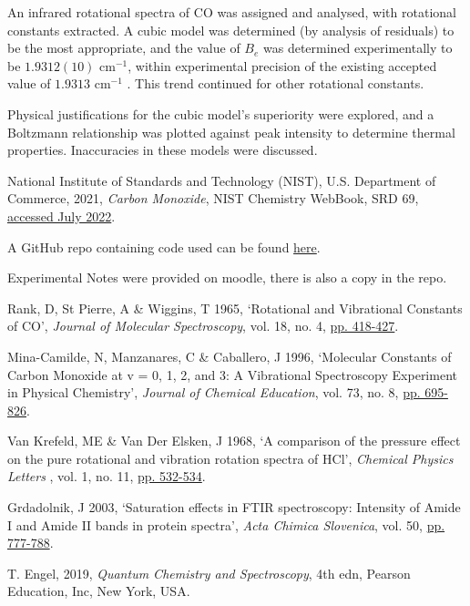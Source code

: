 \documentclass[aps,prl,reprint,10pt,amsmath,amssymb,superscriptaddress,a4paper]{revtex4-2}
\begin{document}
An infrared rotational spectra of CO was assigned and analysed, with rotational constants extracted. A cubic model was determined (by analysis of residuals) to be the most appropriate, and the value of $B_e$ was determined experimentally to be $1.9312(10)$ cm$^{-1}$, within experimental precision of the existing accepted value of $1.9313$ cm$^{-1}$ \cite{NIST}. This trend continued for other rotational constants. 

Physical justifications for the cubic model's superiority were explored, and a Boltzmann relationship was plotted against peak intensity to determine thermal properties. Inaccuracies in these models were discussed.

\begin{thebibliography}{99}

 National Institute of Standards and Technology (NIST), U.S. Department of Commerce, 2021, {\it Carbon Monoxide}, NIST Chemistry WebBook, SRD 69, \href{https://webbook.nist.gov/cgi/cbook.cgi?ID=C630080}{accessed July 2022}. 

 A GitHub repo containing code used can be found \href{https://github.com/Sam-js2/CHEM2011-Lab-Report}{here}.

 Experimental Notes were provided on moodle, there is also a copy in the repo\cite{GitHub}.

 Rank, D, St Pierre, A \& Wiggins, T 1965, ‘Rotational and Vibrational Constants of CO’, {\it Journal of Molecular Spectroscopy}, vol. 18, no. 4, \href{https://www.sciencedirect.com/science/article/abs/pii/0022285265900482}{pp. 418-427}.

 Mina-Camilde, N, Manzanares, C \& Caballero, J 1996, ‘Molecular Constants of Carbon Monoxide at v = 0, 1, 2, and 3: A Vibrational Spectroscopy Experiment in Physical Chemistry’, {\it Journal of Chemical Education}, vol. 73, no. 8, \href{https://doi.org/10.1021/ed073p804}{pp. 695-826}. 

 Van Krefeld, ME \& Van Der Elsken, J 1968, ‘A comparison of the pressure effect on the pure rotational and vibration rotation spectra of HCl’, {\it Chemical Physics Letters }, vol. 1, no. 11, \href{ https://www.sciencedirect.com/science/article/pii/0009261468800119}{pp. 532-534}.

 Grdadolnik, J 2003, ‘Saturation effects in FTIR spectroscopy: Intensity of Amide I and Amide II bands in protein spectra’, {\it Acta Chimica Slovenica}, vol. 50, \href{ https://www.researchgate.net/publication/228541251_Saturation_effects_in_FTIR_spectroscopy_Intensity_of_Amide_I_and_Amide_II_bands_in_protein_spectra }{pp. 777-788}.

 T. Engel, 2019, {\it Quantum Chemistry and Spectroscopy}, 4th edn, Pearson Education, Inc, New York, USA.

\end{thebibliography}
\end{document}
